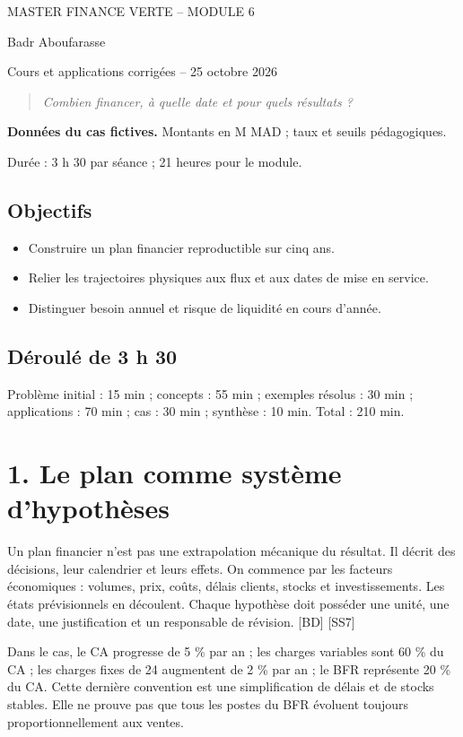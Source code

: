 \documentclass[12pt,a4paper]{article}
\begin{document}
\begin{center}{\small MASTER FINANCE VERTE -- MODULE 6}\par\vspace{8pt}{\Large\bfseries Séance 2 -- Plan financier et trajectoire de transition}\par\vspace{6pt}Badr Aboufarasse\par{\small Cours et applications corrigées -- 25 octobre 2026}\end{center}
\begin{quote}\itshape Combien financer, à quelle date et pour quels résultats ?\end{quote}
\textbf{Données du cas fictives.} Montants en M MAD ; taux et seuils pédagogiques.\par Durée : 3 h 30 par séance ; 21 heures pour le module.

\subsection*{Objectifs}
\begin{itemize}\item Construire un plan financier reproductible sur cinq ans.\item Relier les trajectoires physiques aux flux et aux dates de mise en service.\item Distinguer besoin annuel et risque de liquidité en cours d’année.\end{itemize}
\subsection*{Déroulé de 3 h 30}
Problème initial : 15 min ; concepts : 55 min ; exemples résolus : 30 min ; applications : 70 min ; cas : 30 min ; synthèse : 10 min. Total : 210 min.

\section*{1. Le plan comme système d’hypothèses}
Un plan financier n’est pas une extrapolation mécanique du résultat. Il décrit des décisions, leur calendrier et leurs effets. On commence par les facteurs économiques : volumes, prix, coûts, délais clients, stocks et investissements. Les états prévisionnels en découlent. Chaque hypothèse doit posséder une unité, une date, une justification et un responsable de révision. [BD] [SS7]


Dans le cas, le CA progresse de 5 \% par an ; les charges variables sont 60 \% du CA ; les charges fixes de 24 augmentent de 2 \% par an ; le BFR représente 20 \% du CA. Cette dernière convention est une simplification de délais et de stocks stables. Elle ne prouve pas que tous les postes du BFR évoluent toujours proportionnellement aux ventes.
\end{document}
